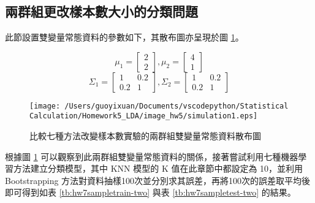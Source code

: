 \subsection{兩群組更改樣本數大小的分類問題}

此節設置雙變量常態資料的參數如下，其散布圖亦呈現於圖 \ref{fig:hw7sample-two}。

$$ \mu_1 = \left[
            \begin{array}{clr}
                2  \\
                2 
            \end{array} \right] ,
            \mu_2 = \left[
            \begin{array}{clr}
                4  \\
                1 
            \end{array} \right] $$ 
$$ \Sigma_1 = \left[
            \begin{array}{clr}
                1 & 0.2  \\
                0.2 & 1
            \end{array} \right] ,
            \Sigma_2 = \left[
            \begin{array}{clr}
                1 & 0.2  \\
                0.2 & 1 
            \end{array} \right]  $$

\begin{figure}[H]
    \centering
        \texttt{[image: /Users/guoyixuan/Documents/vscodepython/Statistical Calculation/Homework5\_LDA/image\_hw5/simulation1.eps]}
    \caption{比較七種方法改變樣本數實驗的兩群組雙變量常態資料散布圖}
    \label{fig:hw7sample-two}
\end{figure} 

根據圖 \ref{fig:hw7sample-two} 可以觀察到此兩群組雙變量常態資料的關係，接著嘗試利用七種機器學習方法建立分類模型，其中 KNN 模型的 K 值在此章節中都設定為 10，並利用 Bootstrapping 方法對資料抽樣100次並分別求其誤差，再將100次的誤差取平均後即可得到如表 \ref{tb:hw7sampletrain-two} 與表 \ref{tb:hw7sampletest-two} 的結果。

\renewcommand\arraystretch{1.5}
\begin{table}[h]
\scriptsize
\setlength{\belowcaptionskip}{0pt}
\centering
\caption{七種機器學習方法改變樣本數的兩群組訓練資料分類錯誤率}\label{tb:hw7sampletrain-two}
\end{table}

